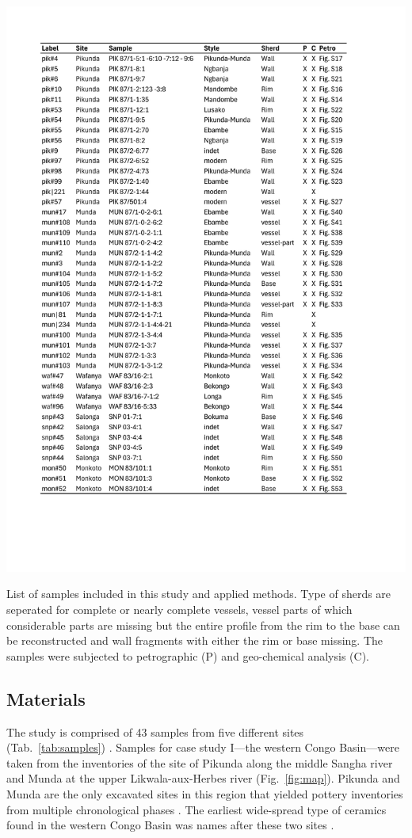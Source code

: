 \documentclass[preprint,10pt,oneside,onecolumn,authoryear]{elsarticle}
\begin{document}
\begin{table}[p]
	\centering
	\includegraphics[height=.88\textheight]{Tab_Samples.pdf}
	\caption{List of samples included in this study and applied methods. Type of sherds are seperated for complete or nearly complete vessels, vessel parts of which considerable parts are missing but the entire profile from the rim to the base can be reconstructed and wall fragments with either the rim or base missing. The samples were subjected to petrographic (P) and geo-chemical analysis (C).}
	\label{tab:samples}	
\end{table}

\subsection{Materials}

The study is comprised of 43 samples from five different sites (Tab.~\ref{tab:samples}) . Samples for case study I---the western Congo Basin---were taken from the inventories of the site of Pikunda along the middle Sangha river and Munda at the upper Likwala-aux-Herbes river (Fig.~\ref{fig:map}). Pikunda and Munda are the only excavated sites in this region that yielded pottery inventories from multiple chronological phases \citep{Seidensticker.2021e}. The earliest wide-spread type of ceramics found in the western Congo Basin was names after these two sites \citep[114--120]{Eggert.1992,Seidensticker.2021e}.
\end{document}
